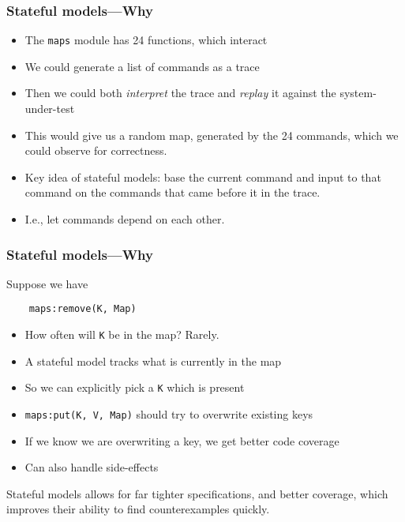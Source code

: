\documentclass[lualatex]{beamer}
\begin{document}
\begin{frame}[fragile]
\frametitle{Stateful models—Why}

\begin{itemize}
\item The \texttt{maps} module has 24 functions, which interact
\item We could generate a list of commands as a trace
\item Then we could both \emph{interpret} the trace and \emph{replay} it against the system-under-test
\item This would give us a random map, generated by the 24 commands, which we could observe for correctness.
\end{itemize}

\begin{itemize}
\item Key idea of stateful models: base the current command and input to that command on the commands that came before it in the trace.
\item I.e., let commands depend on each other.
\end{itemize}
\end{frame}

\begin{frame}[fragile]
\frametitle{Stateful models—Why}

Suppose we have
\begin{Verbatim}
	maps:remove(K, Map)
\end{Verbatim}

\begin{itemize}
\item How often will \texttt{K} be in the map? Rarely.
\item A stateful model tracks what is currently in the map
\item So we can explicitly pick a \texttt{K} which is present
\end{itemize}

\begin{itemize}
\item \texttt{maps:put(K, V, Map)} should try to overwrite existing keys
\item If we know we are overwriting a key, we get better code coverage
\item Can also handle side-effects
\end{itemize}

Stateful models allows for far tighter specifications, and better coverage, which improves their ability to find counterexamples quickly.
\end{frame}
\end{document}
